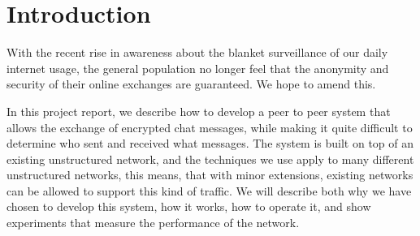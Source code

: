 \section{Introduction}
With the recent rise in awareness about the blanket surveillance of our daily internet usage, the general population no longer feel that the anonymity and security of their online exchanges are guaranteed. We hope to amend this. 

In this project report, we describe how to develop a peer to peer system that allows the exchange of  encrypted chat messages, while making it quite difficult to determine who sent and received what messages.
The system is built on top of an existing unstructured network, and the techniques we use apply to many different unstructured networks, this means, that with minor extensions, existing networks can be allowed to support this kind of traffic.
We will describe both why we have chosen to develop this system, how it works, how to operate it, and show experiments that measure the performance of the network.